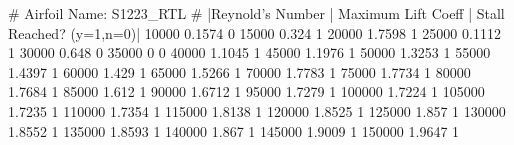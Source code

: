 # Airfoil Name: S1223_RTL
# |Reynold's Number | Maximum Lift Coeff | Stall Reached? (y=1,n=0)|
10000 0.1574 0
15000 0.324 1
20000 1.7598 1
25000 0.1112 1
30000 0.648 0
35000 0   0
40000 1.1045 1
45000 1.1976 1
50000 1.3253 1
55000 1.4397 1
60000 1.429 1
65000 1.5266 1
70000 1.7783 1
75000 1.7734 1
80000 1.7684 1
85000 1.612 1
90000 1.6712 1
95000 1.7279 1
100000 1.7224 1
105000 1.7235 1
110000 1.7354 1
115000 1.8138 1
120000 1.8525 1
125000 1.857 1
130000 1.8552 1
135000 1.8593 1
140000 1.867 1
145000 1.9009 1
150000 1.9647 1
